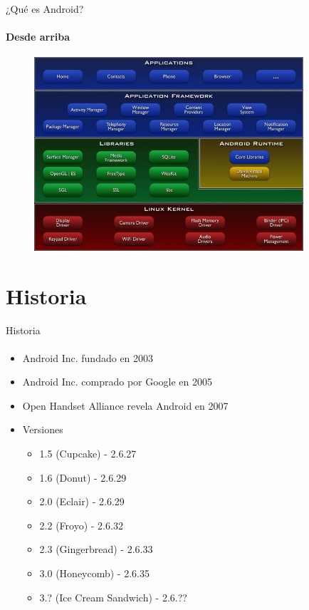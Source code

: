 \documentclass[12pt]{beamer}
\begin{document}
\begin{frame}{¿Qué es Android?}
    \framesubtitle{Desde arriba}
    \center
    \begin{figure}
        \includegraphics[width=10cm]{android-architecture.jpg}
    \end{figure}
\end{frame}

\section{Historia}

\begin{frame}{Historia}
    \framesubtitle{}
    \begin{itemize}
        \item Android Inc. fundado en 2003
        \item Android Inc. comprado por Google en 2005
        \item Open Handset Alliance revela Android en 2007
        \item Versiones
        \begin{itemize}
            \item 1.5 (Cupcake) - 2.6.27
            \item 1.6 (Donut) - 2.6.29
            \item 2.0 (Eclair) - 2.6.29
            \item 2.2 (Froyo) - 2.6.32
            \item 2.3 (Gingerbread) - 2.6.33
            \item 3.0 (Honeycomb) - 2.6.35
            \item 3.? (Ice Cream Sandwich) - 2.6.??
        \end{itemize}
    \end{itemize}
\end{frame}
\end{document}
